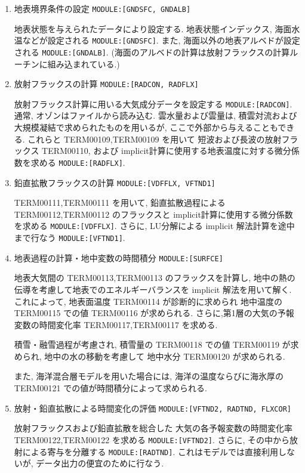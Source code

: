 \begin{enumerate}
\begin{enumerate}
\item 地表境界条件の設定 \texttt{MODULE:[GNDSFC, GNDALB]}

地表状態を与えられたデータにより設定する.
地表状態インデックス, 海面水温などが設定される \texttt{MODULE:[GNDSFC]}.
また, 海面以外の地表アルベドが設定される \texttt{MODULE:[GNDALB]}.
(海面のアルベドの計算は放射フラックスの計算ルーチンに組み込まれている.)

\item 放射フラックスの計算 \texttt{MODULE:[RADCON, RADFLX]}

放射フラックス計算に用いる大気成分データを設定する \texttt{MODULE:[RADCON]}.
通常, オゾンはファイルから読み込む.
雲水量および雲量は, 積雲対流および大規模凝結で求められたものを用いるが,
ここで外部から与えることもできる.
これらと TERM00109,TERM00109 を用いて
短波および長波の放射フラックス TERM00110, および
implicit計算に使用する地表温度に対する微分係数を求める \texttt{MODULE:[RADFLX]}.

\item 鉛直拡散フラックスの計算 \texttt{MODULE:[VDFFLX, VFTND1]}

TERM00111,TERM00111 
を用いて,
鉛直拡散過程による TERM00112,TERM00112 のフラックスと
implicit計算に使用する微分係数を求める \texttt{MODULE:[VDFFLX]}.
さらに, LU分解による implicit 解法計算を途中まで行なう \texttt{MODULE:[VFTND1]}.

\item 地表過程の計算・地中変数の時間積分 \texttt{MODULE:[SURFCE]}

地表大気間の  TERM00113,TERM00113 のフラックスを計算し,
地中の熱の伝導を考慮して地表でのエネルギーバランスを
implicit 解法を用いて解く.
これによって, 地表面温度 TERM00114 が診断的に求められ
地中温度の TERM00115 での値
TERM00116
が求められる.
さらに,第1層の大気の予報変数の時間変化率
TERM00117,TERM00117 を求める.

積雪・融雪過程が考慮され, 
積雪量の TERM00118 での値 TERM00119 が求められ,
地中の水の移動を考慮して
地中水分 TERM00120 が求められる.

また, 海洋混合層モデルを用いた場合には,
海洋の温度ならびに海氷厚の 
TERM00121 での値が時間積分によって求められる.

\item 放射・鉛直拡散による時間変化の評価 \texttt{MODULE:[VFTND2, RADTND, FLXCOR]}

放射フラックスおよび鉛直拡散を総合した
大気の各予報変数の時間変化率 \\
TERM00122,TERM00122 を求める \texttt{MODULE:[VFTND2]}.
さらに, その中から放射による寄与を分離する \texttt{MODULE:[RADTND]}.
これはモデルでは直接利用しないが,
データ出力の便宜のために行なう.


\end{enumerate}
\end{enumerate}
